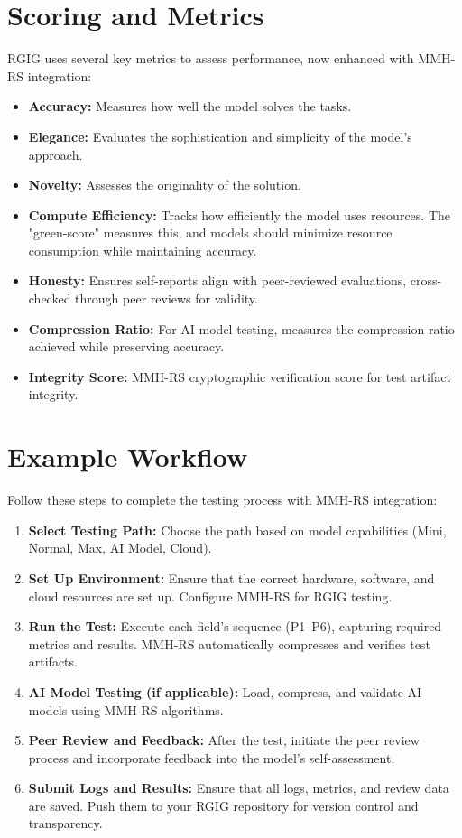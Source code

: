 \section*{Scoring and Metrics}
RGIG uses several key metrics to assess performance, now enhanced with MMH-RS integration:

\begin{itemize}
  \item \textbf{Accuracy:} Measures how well the model solves the tasks.
  \item \textbf{Elegance:} Evaluates the sophistication and simplicity of the model's approach.
  \item \textbf{Novelty:} Assesses the originality of the solution.
  \item \textbf{Compute Efficiency:} Tracks how efficiently the model uses resources. The "green-score" measures this, and models should minimize resource consumption while maintaining accuracy.
  \item \textbf{Honesty:} Ensures self-reports align with peer-reviewed evaluations, cross-checked through peer reviews for validity.
  \item \textbf{Compression Ratio:} For AI model testing, measures the compression ratio achieved while preserving accuracy.
  \item \textbf{Integrity Score:} MMH-RS cryptographic verification score for test artifact integrity.
\end{itemize}

\section*{Example Workflow}
Follow these steps to complete the testing process with MMH-RS integration:

\begin{enumerate}
  \item \textbf{Select Testing Path:} Choose the path based on model capabilities (Mini, Normal, Max, AI Model, Cloud).
  \item \textbf{Set Up Environment:} Ensure that the correct hardware, software, and cloud resources are set up. Configure MMH-RS for RGIG testing.
  \item \textbf{Run the Test:} Execute each field's sequence (P1–P6), capturing required metrics and results. MMH-RS automatically compresses and verifies test artifacts.
  \item \textbf{AI Model Testing (if applicable):} Load, compress, and validate AI models using MMH-RS algorithms.
  \item \textbf{Peer Review and Feedback:} After the test, initiate the peer review process and incorporate feedback into the model's self-assessment.
  \item \textbf{Submit Logs and Results:} Ensure that all logs, metrics, and review data are saved. Push them to your RGIG repository for version control and transparency.
\end{enumerate}


